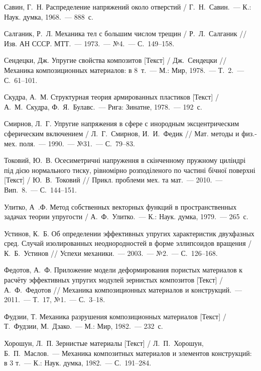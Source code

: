 \begin{biblist}{99}
Савин, Г.~Н. 
Распределение напряжений около отверстий 
/ Г.~Н.~Савин.~--- К.: Наук. думка, 1968.~--- 888~с.

Салганик, Р.~Л. 
Механика тел с большим числом трещин  
/ Р.~Л.~Салганик 
// Изв. АН СССР. МТТ.~--- 1973.~--- №4.~--- С.~149--158.

Сендецки, Дж. 
Упругие свойства композитов [Текст] 
/ Дж.~Сендецки 
// Механика композиционных материалов: в 8~т.~--- М.: Мир, 1978.~--- Т.~2.~--- С.~61--101.

Скудра, А.~М. 
Структурная теория армированных пластиков [Текст] 
/ А.~М.~Скудра, Ф.~Я.~Булавс.~--- Рига: Зинатне, 1978.~--- 192~с.

Смирнов, Л.~Г. 
Упругие напряжения в сфере с инородным эксцентрическим сферическим включением 
/ Л.~Г.~Смирнов,  И.~И.~Федик 
// Мат. методы и физ.-мех. поля.~--- 1990.~--- №31.~--- С.~79--83.


Токовий, Ю.~В. 
Осесиметричні напруження в скінченному пружному циліндрі під дією нормального тиску, рівномірно розподіленого по частині бічної поверхні [Текст] 
/ Ю.~В.~Токовий 
// Прикл. проблеми мех. та мат.~--- 2010.~--- Вип.~8.~--- С.~144--151.

Улитко, А~.Ф. 
Метод собственных векторных функций в пространственных задачах теории упругости 
/ А.~Ф.~Улитко.~--- К.: Наук. думка, 1979.~--- 265~с.

Устинов, К.~Б. 
Об определении эффективных упругих характеристик двухфазных сред. Случай изолированных неоднородностей в форме эллипсоидов вращения  
/ К.~Б.~Устинов 
// Успехи механики.~--- 2003.~--- №2.~--- С.~126--168.

Федотов, А.~Ф. 
Приложение модели деформирования пористых материалов к расчёту эффективных упругих модулей зернистых композитов [Текст] 
/ А.~Ф.~Федотов 
// Механика композиционных материалов и конструкций.~--- 2011.~--- Т.~17, №1.~--- С.~3--18.

Фудзии, Т. 
Механика разрушения композиционных материалов [Текст] 
/ Т.~Фудзии, М.~Дзако.~--- М.: Мир, 1982.~--- 232~с.

Хорошун, Л.~П. 
Зернистые материалы [Текст] 
/ Л.~П.~Хорошун, Б.~П.~Маслов.~--- Механика композитных материалов и элементов конструкций: в 3 т.~--- К.: Наук. думка, 1982.~--- С.~191--284.


\end{biblist}
